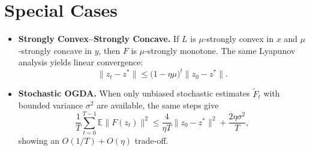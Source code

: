 \documentclass{article}
\newcommand{\E}{\mathbb{E}}
\begin{document}
\section*{Special Cases}
\begin{itemize}
\item \textbf{Strongly Convex–Strongly Concave.}
If $L$ is $\mu$‑strongly convex in $x$ and $\mu$‑strongly concave in $y$, then $F$ is $\mu$‑strongly monotone.
The same Lyapunov analysis yields linear convergence:
\[
\|z_{t}-z^{*}\|\le\bigl(1-\eta\mu\bigr)^{t}\|z_{0}-z^{*}\|.
\]
\item \textbf{Stochastic OGDA.}
When only unbiased stochastic estimates $\tilde{F}_{t}$ with bounded variance $\sigma^{2}$ are available,
the same steps give
\[
\frac{1}{T}\sum_{t=0}^{T-1}\E\|F(z_{t})\|^{2}
\le \frac{4}{\eta T}\|z_{0}-z^{*}\|^{2}
+\frac{2\eta\sigma^{2}}{T},
\]
showing an $O(1/T)+O(\eta)$ trade‑off.
\end{itemize}
\end{document}
